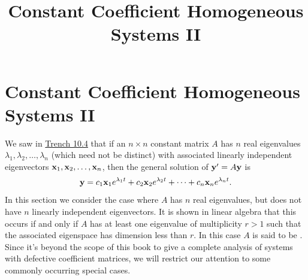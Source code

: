 \documentclass{ximera}
\title{Constant Coefficient Homogeneous Systems II}%
\begin{document}
\begin{abstract}

\end{abstract}

\maketitle

\section*{Constant Coefficient Homogeneous Systems II}

We saw in \href{https://ximera.osu.edu/ode/main/constCoeffHomSysI/constCoeffHomSysI}{Trench 10.4} that if an $n\times n$
constant matrix
$A$ has $n$ real eigenvalues $\lambda_1, \lambda_2, \dots, \lambda_n$
(which need not be distinct) with associated linearly independent
eigenvectors ${\bf x}_1, {\bf x}_2, \dots, {\bf x}_n$, then the general
solution of ${\bf y}'=A{\bf y}$ is
$$
{\bf y}=c_1{\bf x}_1e^{\lambda_1t}+c_2{\bf x}_2e^{\lambda_2 t}
+\cdots+c_n{\bf x}_ne^{\lambda_n t}.
$$
In this section we consider the case where $A$ has $n$ real
eigenvalues, but does not have $n$ linearly independent eigenvectors.
It is shown in linear algebra that this occurs if and only if $A$ has
at least one eigenvalue of multiplicity $r>1$ such that the associated
eigenspace has dimension less than $r$. In this case $A$ is said to be
. Since it's beyond the scope of this book to give a
complete analysis of systems with defective coefficient matrices, we
will restrict our attention to some commonly occurring special cases.
\end{document}
